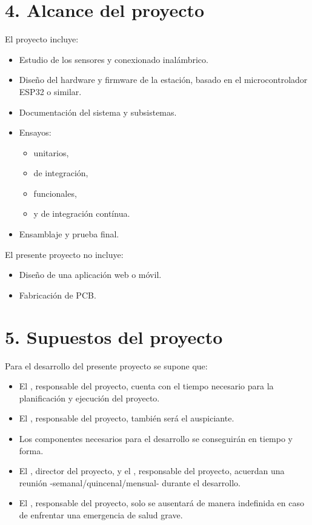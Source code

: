 \documentclass[
11pt, %
codirector, %
]{charter}
\begin{document}
\section{4. Alcance del proyecto}
\label{sec:alcance}

El proyecto incluye:
\begin{itemize}
	\item Estudio de los sensores y conexionado inalámbrico.
	\item Diseño del hardware y firmware de la estación, basado en el microcontrolador ESP32 o similar.
	\item Documentación del sistema y subsistemas.
	\item Ensayos:
	\begin{itemize}
		\item unitarios,
		\item de integración,
		\item funcionales,
		\item y de integración contínua.
		\end{itemize}
	\item Ensamblaje y prueba final.
	
\end{itemize}

\newpage
El presente proyecto no incluye:

\begin{itemize}
	\item Diseño de una aplicación web o móvil.
	\item Fabricación de PCB.
	
\end{itemize}

\section{5. Supuestos del proyecto}
\label{sec:supuestos}

Para el desarrollo del presente proyecto se supone que:

\begin{itemize}
	\item El \authorname, responsable del proyecto, cuenta con el tiempo necesario para
la planificación y ejecución del proyecto.
	\item El \authorname, responsable del proyecto, también será el auspiciante.
	\item Los componentes necesarios para el desarrollo se conseguirán en tiempo y forma.
	\item El \supname, director del proyecto, y el \authorname, responsable del
proyecto, acuerdan una reunión -semanal/quincenal/mensual- durante el desarrollo.
	\item El \authorname, responsable del proyecto, solo se ausentará de manera indefinida en caso de enfrentar una emergencia de salud grave.
\end{itemize}
\end{document}
